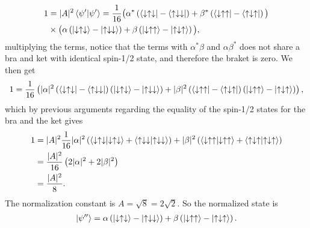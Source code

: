 \documentclass[a4paper,10pt]{article}
\begin{document}
\begin{align*}
1 &= |A|^2 \braket{\psi'}{\psi'}  = \frac{1}{16}\big(\alpha^* \left(\bra{\downarrow \uparrow \downarrow} - \bra{\uparrow\downarrow\downarrow}\right) + \beta^* \left(\bra{\downarrow\uparrow\uparrow} - \bra{\uparrow\downarrow\uparrow}\right)\big)\\
&\times \big( 
\alpha\left(\ket{\downarrow\uparrow\downarrow} - \ket{\uparrow\downarrow\downarrow}\right) + \beta\left( \ket{\downarrow\uparrow\uparrow} - \ket{\uparrow\downarrow\uparrow}\right)\big),
\end{align*}
%
multiplying the terms, notice that the terms with $\alpha^*\beta$ and $\alpha\beta^*$ does not share a bra and ket with identical spin-1/2 state, and therefore the braket is zero. We then get 
%
\begin{align*}
1 = \frac{1}{16} \left(|\alpha|^2\left(\bra{\downarrow\uparrow\downarrow} - \bra{\uparrow\downarrow\downarrow}\right)\left(\ket{\downarrow\uparrow\downarrow} - \ket{\uparrow\downarrow\downarrow}\right) + |\beta|^2\left(\bra{\downarrow\uparrow\uparrow} - \bra{\uparrow\downarrow\uparrow}\right)\left(\ket{\downarrow\uparrow\uparrow} - \ket{\uparrow\downarrow\uparrow}\right)\right),
\end{align*}
%
which by previous arguments regarding the equality of the spin-1/2 states for the bra and the ket gives
%
\begin{align*}
1 &= |A|^2 \frac{1}{16}|\alpha|^2\left(\braket{\downarrow\uparrow\downarrow}{\downarrow\uparrow\downarrow} + \braket{\uparrow\downarrow\downarrow}{\uparrow\downarrow\downarrow}\right) + |\beta|^2\left(\braket{\downarrow\uparrow\uparrow}{\downarrow\uparrow\uparrow} + \braket{\uparrow\downarrow\uparrow}{\uparrow\downarrow\uparrow}\right) \\
&= \frac{|A|^2}{16}\left( 2|\alpha|^2 + 2|\beta|^2\right) \\
&= \frac{|A|^2}{8}.
\end{align*}
%
The normalization constant is $A = \sqrt{8} = 2\sqrt{2}$. So the normalized state is
%
\begin{align*}
\ket{\psi''} = \alpha\left(\ket{\downarrow\uparrow\downarrow} - \ket{\uparrow\downarrow\downarrow}\right) + \beta\left(\ket{\downarrow\uparrow\uparrow} - \ket{\uparrow\downarrow\uparrow}\right).
\end{align*}
\end{document}
